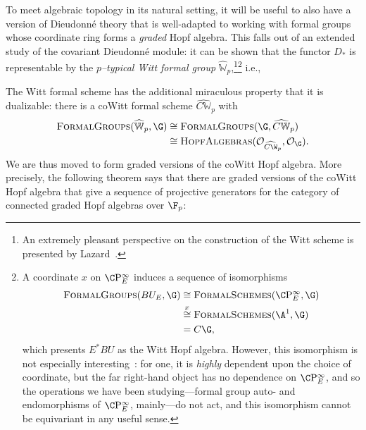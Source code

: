 To meet algebraic topology in its natural setting, it will be useful to also have a version of Dieudonn\'e theory that is well-adapted to working with formal groups whose coordinate ring forms a \emph{graded} Hopf algebra.  This falls out of an extended study of the covariant Dieudonn\'e module: it can be shown that the functor $D_*$ is representable by the \textit{$p$--typical Witt formal group} $\widehat{\mathbb W}_p$,\footnote{An extremely pleasant perspective on the construction of the Witt scheme is presented by Lazard~\cite[Chapter III]{LazardCFGs}.}\footnote{A coordinate \(x\) on \(\CP^\infty_E\) induces a sequence of isomorphisms
\begin{align*}
\CatOf{FormalGroups}(BU_E, \G) & \cong \CatOf{FormalSchemes}(\CP^\infty_E, \G) \\
& \stackrel{x}{\cong} \CatOf{FormalSchemes}(\A^1, \G) \\
& = C\G,
\end{align*}
which presents \(E^* BU\) as the Witt Hopf algebra.  However, this isomorphism is not especially interesting~\cite[Remark 18.1]{StricklandFPFP}: for one, it is \emph{highly} dependent upon the choice of coordinate, but the far right-hand object has no dependence on \(\CP^\infty_E\), and so the operations we have been studying---formal group auto- and endomorphisms of \(\CP^\infty_E\), mainly---do not act, and this isomorphism cannot be equivariant in any useful sense.} i.e.,
\begin{center}
\end{center}

The Witt formal scheme has the additional miraculous property that it is dualizable: there is a coWitt formal scheme $\widehat{C\mathbb W}_p$ with
\begin{align*}
\CatOf{FormalGroups}(\widehat{\mathbb W}_p, \G) & \cong \CatOf{FormalGroups}(\G, \widehat{C\mathbb W}_p) \\
& \cong \CatOf{HopfAlgebras}(\sheaf O_{\widehat{C\W}_p}, \sheaf O_{\G}).
\end{align*}
We are thus moved to form graded versions of the coWitt Hopf algebra.  More precisely, the following theorem says that there are graded versions of the coWitt Hopf algebra that give a sequence of projective generators for the category of connected graded Hopf algebras over \(\F_p\):

